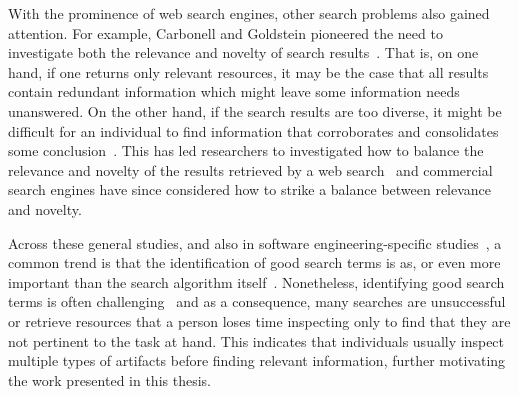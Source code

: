 With the prominence of web search engines, other search problems also gained attention.
For example,  Carbonell and Goldstein pioneered the need 
to investigate both the relevance and novelty of search results~\cite{Carbonell1998}.
That is, on one hand, if one returns only relevant resources, it may be the case that all results contain redundant information 
which might leave some information needs unanswered. 
On the other hand, if the search results are too diverse, it might be difficult for an individual 
to find information that corroborates and consolidates some conclusion~\cite{clark2013relevance}.  
This has led researchers to investigated 
how to balance the relevance and novelty of the results retrieved
by a web search~\cite{najork2001, rafiei2010, vieira2011}
and commercial search engines have since considered how to strike a balance
between relevance and novelty.





Across these general studies, and also in software engineering-specific studies~\cite{Starke2009, Brandt2009a, DeGraaf2014},
a common trend is that the identification of good search terms is as, or even more
important than the search algorithm itself~\cite{Kevic2014}. 
Nonetheless, identifying good search terms is often challenging~\cite{novotny2004don, Haiduc2013} and 
as a consequence, many searches are unsuccessful or retrieve resources that 
a person loses time inspecting only to find that they are not pertinent to the task at hand.
This indicates that individuals usually inspect multiple types of artifacts 
before finding relevant information, further motivating
the work presented in this thesis.





